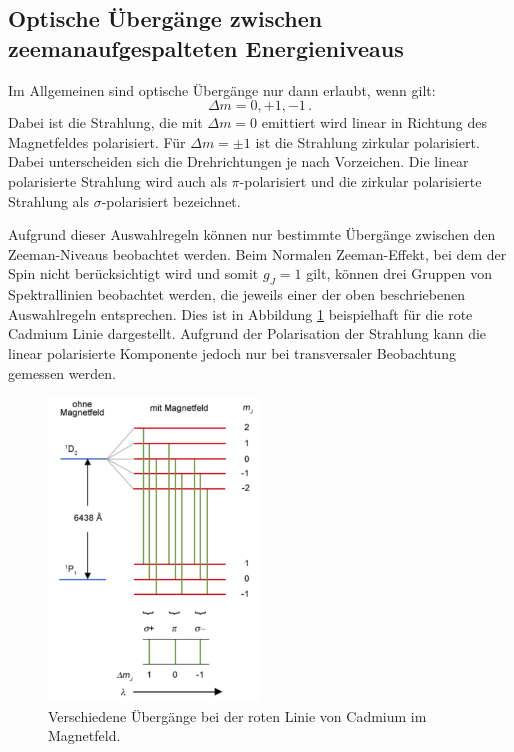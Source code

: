 \subsection{Optische Übergänge zwischen zeemanaufgespalteten Energieniveaus}

Im Allgemeinen sind optische Übergänge nur dann erlaubt, wenn gilt:
\begin{equation}
  \Delta m= 0, +1 , -1 \,.
\end{equation}
Dabei ist die Strahlung, die mit $\Delta m= 0$ emittiert wird linear in Richtung des
Magnetfeldes polarisiert. Für $\Delta m= \pm1$ ist die Strahlung zirkular polarisiert.
Dabei unterscheiden sich die Drehrichtungen je nach Vorzeichen. Die linear polarisierte
Strahlung wird auch als $\pi$-polarisiert und die zirkular polarisierte Strahlung als
$\sigma$-polarisiert bezeichnet.

Aufgrund dieser Auswahlregeln können nur bestimmte Übergänge zwischen den Zeeman-Niveaus
beobachtet werden. Beim Normalen Zeeman-Effekt, bei dem der Spin nicht berücksichtigt wird
und somit $g_J=1$ gilt,
können drei Gruppen von Spektrallinien beobachtet werden, die jeweils einer der oben
beschriebenen Auswahlregeln entsprechen. Dies ist in Abbildung \ref{fig:cdrot} beispielhaft
für die rote Cadmium Linie dargestellt. Aufgrund der Polarisation der Strahlung kann
die linear polarisierte Komponente jedoch nur bei transversaler Beobachtung gemessen werden.

\begin{figure}
  \centering
  \includegraphics[width=0.5\textwidth]{data/cd_rot.png}
  \caption{Verschiedene Übergänge bei der roten Linie von Cadmium im Magnetfeld. \cite{cdrot}}
  \label{fig:cdrot}
\end{figure}

